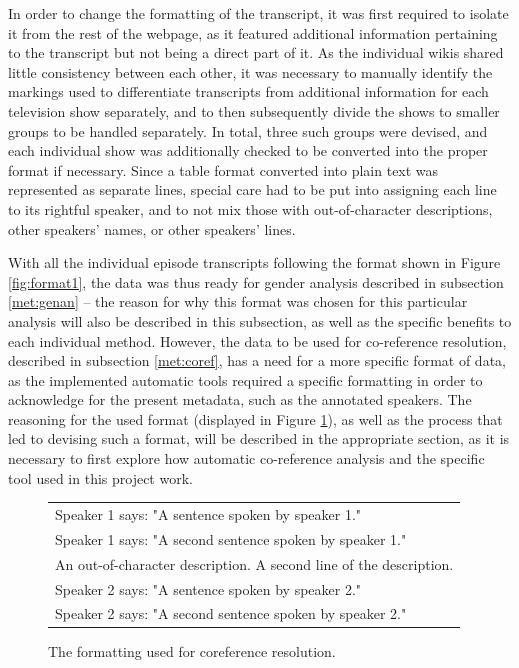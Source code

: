 \documentclass[a4paper, 11pt]{article}
\begin{document}
In order to change the formatting of the transcript, it was first required to isolate it from the rest of the webpage, as it featured additional information pertaining to the transcript but not being a direct part of it. As the individual wikis shared little consistency between each other, it was necessary to manually identify the markings used to differentiate transcripts from additional information for each television show separately, and to then subsequently divide the shows to smaller groups to be handled separately. In total, three such groups were devised, and each individual show was additionally checked to be converted into the proper format if necessary. Since a table format converted into plain text was represented as separate lines, special care had to be put into assigning each line to its rightful speaker, and to not mix those with out-of-character descriptions, other speakers' names, or other speakers' lines.

With all the individual episode transcripts following the format shown in Figure \ref{fig:format1}, the data was thus ready for gender analysis described in subsection \ref{met:genan} -- the reason for why this format was chosen for this particular analysis will also be described in this subsection, as well as the specific benefits to each individual method. However, the data to be used for co-reference resolution, described in subsection \ref{met:coref}, has a need for a more specific format of data, as the implemented automatic tools required a specific formatting in order to acknowledge for the present metadata, such as the annotated speakers. The reasoning for the used format (displayed in Figure \ref{fig:formatcoref}), as well as the process that led to devising such a format, will be described in the appropriate section, as it is necessary to first explore how automatic co-reference analysis and the specific tool used in this project work.

\begin{figure}[h!]
  \centering
  \begin{small}
  \begin{tabular}{l}
  Speaker 1 says: "A sentence spoken by speaker 1." \\
  Speaker 1 says: "A second sentence spoken by speaker 1." \\
  An out-of-character description. A second line of the description. \\
  Speaker 2 says: "A sentence spoken by speaker 2." \\
  Speaker 2 says: "A second sentence spoken by speaker 2." \\
  \end{tabular}
  \end{small}
  \caption{The formatting used for coreference resolution.}
  \label{fig:formatcoref}
\end{figure}
\end{document}
